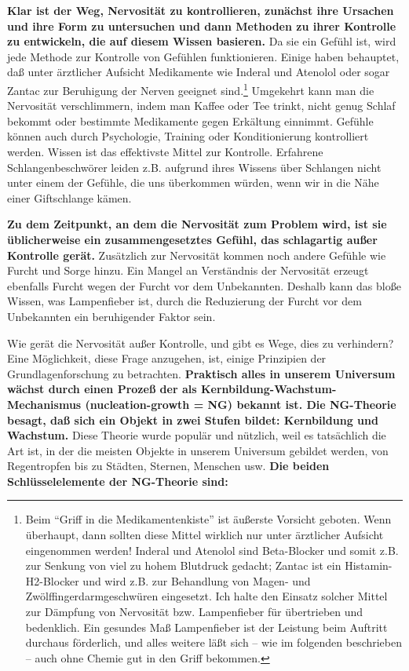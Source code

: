 \textbf{Klar ist der Weg, Nervosität zu kontrollieren, zunächst ihre Ursachen und ihre Form zu untersuchen und dann Methoden zu ihrer Kontrolle zu entwickeln, die auf diesem Wissen basieren.}
Da sie ein Gefühl ist, wird jede Methode zur Kontrolle von Gefühlen funktionieren.
Einige haben behauptet, daß unter ärztlicher Aufsicht Medikamente wie Inderal und Atenolol oder sogar Zantac zur Beruhigung der Nerven geeignet sind.\footnote{Beim \enquote{Griff in die Medikamentenkiste} ist äußerste Vorsicht geboten. Wenn überhaupt, dann sollten diese Mittel wirklich nur unter ärztlicher Aufsicht eingenommen werden! Inderal und Atenolol sind Beta-Blocker und somit z.B. zur Senkung von viel zu hohem Blutdruck gedacht; Zantac ist ein Histamin-H2-Blocker und wird z.B. zur Behandlung von Magen- und Zwölffingerdarmgeschwüren eingesetzt. Ich halte den Einsatz solcher Mittel zur Dämpfung von Nervosität bzw. Lampenfieber für übertrieben und bedenklich.
Ein gesundes Maß Lampenfieber ist der Leistung beim Auftritt durchaus förderlich, und alles weitere läßt sich -- wie im folgenden beschrieben -- auch ohne Chemie gut in den Griff bekommen.}
Umgekehrt kann man die Nervosität verschlimmern, indem man Kaffee oder Tee trinkt, nicht genug Schlaf bekommt oder bestimmte Medikamente gegen Erkältung einnimmt.
Gefühle können auch durch Psychologie, Training oder Konditionierung kontrolliert werden.
Wissen ist das effektivste Mittel zur Kontrolle.
Erfahrene Schlangenbeschwörer leiden z.B. aufgrund ihres Wissens über Schlangen nicht unter einem der Gefühle, die uns überkommen würden, wenn wir in die Nähe einer Giftschlange kämen.

\textbf{Zu dem Zeitpunkt, an dem die Nervosität zum Problem wird, ist sie üblicherweise ein zusammengesetztes Gefühl, das schlagartig außer Kontrolle gerät.}
Zusätzlich zur Nervosität kommen noch andere Gefühle wie Furcht und Sorge hinzu.
Ein Mangel an Verständnis der Nervosität erzeugt ebenfalls Furcht wegen der Furcht vor dem Unbekannten.
Deshalb kann das bloße Wissen, was Lampenfieber ist, durch die Reduzierung der Furcht vor dem Unbekannten ein beruhigender Faktor sein.


\label{ng}

Wie gerät die Nervosität außer Kontrolle, und gibt es Wege, dies zu verhindern?
Eine Möglichkeit, diese Frage anzugehen, ist, einige Prinzipien der Grundlagenforschung zu betrachten.
\textbf{Praktisch alles in unserem Universum wächst durch einen Prozeß der als Kernbildung-Wachstum-Mechanismus (nucleation-growth = NG) bekannt ist.
Die NG-Theorie besagt, daß sich ein Objekt in zwei Stufen bildet: Kernbildung und Wachstum.}
Diese Theorie wurde populär und nützlich, weil es tatsächlich die Art ist, in der die meisten Objekte in unserem Universum gebildet werden, von Regentropfen bis zu Städten, Sternen, Menschen usw.
\textbf{Die beiden Schlüsselelemente der NG-Theorie sind:}

